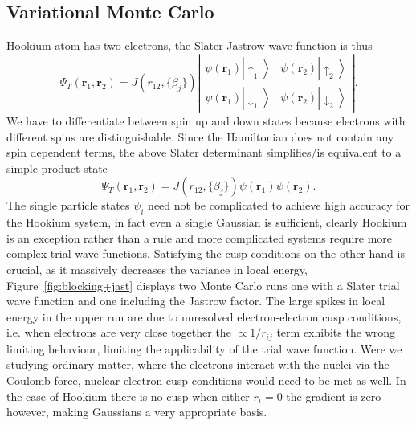 \documentclass[final,3p,times,twocolumn]{elsarticle}
\begin{document}
	\subsection{Variational Monte Carlo}
	Hookium atom has two electrons, the Slater-Jastrow wave function is thus
	\begin{equation}
		\Psi_{T}(\mathbf{r}_1, \mathbf{r}_2) = J(r_{12},\{\beta_{j}\})\left|
		\begin{array}{ll}\psi\left(\mathbf{r}_{1}\right)\left|\uparrow_{1}\right\rangle & \psi\left(\mathbf{r}_{2}\right)\left|\uparrow_{2}\right\rangle \\ \psi\left(\mathbf{r}_{1}\right)\left|\downarrow_{1}\right\rangle & \psi\left(\mathbf{r}_{2}\right)\left|\downarrow_{2}\right\rangle
		\end{array}
	\right|.
	\end{equation}
	We have to differentiate between spin up and down states because electrons with different spins are distinguishable. Since the Hamiltonian does not contain any spin dependent terms, the above Slater determinant simplifies/is equivalent to a simple product state
	\begin{equation}
		\Psi_{T}\left(\mathbf{r}_{1}, \mathbf{r}_{2}\right)=J(r_{12},\{\beta_{j}\})\psi(\mathbf{r}_{1})\psi(\mathbf{r}_{2}).
	\end{equation}
	The single particle states $\psi_i$ need not be complicated to achieve high accuracy for the Hookium system, in fact even a single Gaussian is sufficient, clearly Hookium is an exception rather than a rule and more complicated systems require more complex trial wave functions. Satisfying the cusp conditions on the other hand is crucial, as it massively decreases the variance in local energy, Figure~\ref{fig:blocking+jast} displays two Monte Carlo runs one with a Slater trial wave function and one including the Jastrow factor. The large spikes in local energy in the upper run are due to unresolved electron-electron cusp conditions, i.e. when electrons are very close together the $\propto 1/r_{ij}$ term exhibits the wrong limiting behaviour, limiting the applicability of the trial wave function. Were we studying ordinary matter, where the electrons interact with the nuclei via the Coulomb force, nuclear-electron cusp conditions would need to be met as well. In the case of Hookium there is no cusp when either $r_i = 0$ the gradient is zero however, making Gaussians a very appropriate basis. 
	
\end{document}
